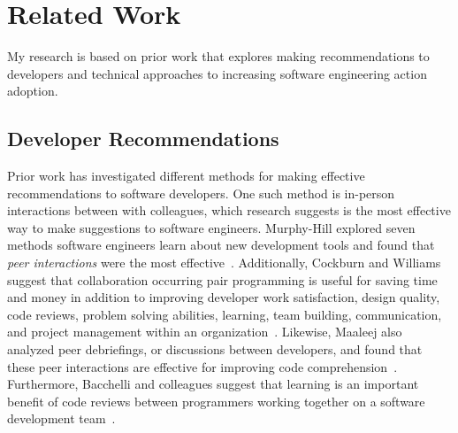 \section{Related Work}

My research is based on prior work that explores making recommendations to developers and technical approaches to increasing software engineering action adoption.

\subsection{Developer Recommendations} 

Prior work has investigated different methods for making effective recommendations to software developers. One such method is in-person interactions between with colleagues, which research suggests is the most effective way to make suggestions to software engineers. Murphy-Hill explored seven methods software engineers learn about new development tools and found that \textit{peer interactions} were the most effective~\cite{Murphy-Hill2015HowDoUsers}. Additionally, Cockburn and Williams suggest that collaboration occurring pair programming is useful for saving time and money in addition to  improving developer work satisfaction, design quality, code reviews, problem solving abilities, learning, team building, communication, and project management within an  organization~\cite{WilliamsPairProgramming}. Likewise, Maaleej also analyzed peer debriefings, or discussions between developers, and found that these peer interactions are effective for improving code comprehension~\cite{Maalej2014Comprehension}. Furthermore, Bacchelli and colleagues suggest that learning is an important benefit of code reviews between programmers working together on a software development team~\cite{bacchelli2013codereview}. 

